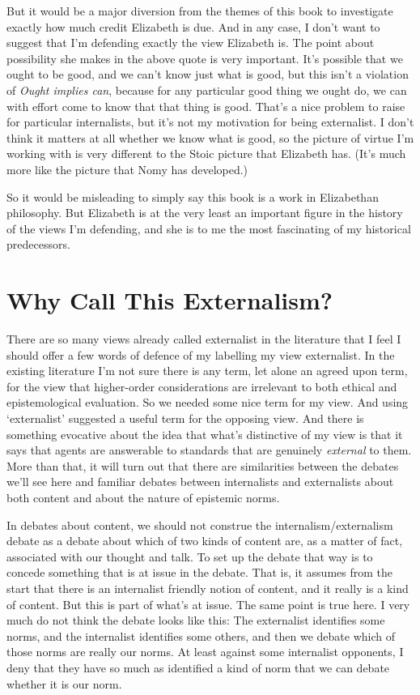But it would be a major diversion from the themes of this book to investigate exactly how much credit Elizabeth is due. And in any case, I don't want to suggest that I'm defending exactly the view Elizabeth is. The point about possibility she makes in the above quote is very important. It's possible that we ought to be good, and we can't know just what is good, but this isn't a violation of \emph{Ought implies can}, because for any particular good thing we ought do, we can with effort come to know that that thing is good. That's a nice problem to raise for particular internalists, but it's not my motivation for being externalist. I don't think it matters at all whether we know what is good, so the picture of virtue I'm working with is very different to the Stoic picture that Elizabeth has. (It's much more like the picture that Nomy \citet{Arpaly2003} has developed.)

So it would be misleading to simply say this book is a work in Elizabethan philosophy. But Elizabeth is at the very least an important figure in the history of the views I'm defending, and she is to me the most fascinating of my historical predecessors.

\section{Why Call This Externalism?}
\label{whycallthisexternalism}

There are so many views already called externalist in the literature that I feel I should offer a few words of defence of my labelling my view externalist. In the existing literature I'm not sure there is any term, let alone an agreed upon term, for the view that higher-order considerations are irrelevant to both ethical and epistemological evaluation. So we needed some nice term for my view. And using `externalist' suggested a useful term for the opposing view. And there is something evocative about the idea that what's distinctive of my view is that it says that agents are answerable to standards that are genuinely \emph{external} to them. More than that, it will turn out that there are similarities between the debates we'll see here and familiar debates between internalists and externalists about both content and about the nature of epistemic norms.

In debates about content, we should not construe the internalism\slash externalism debate as a debate about which of two kinds of content are, as a matter of fact, associated with our thought and talk. To set up the debate that way is to concede something that is at issue in the debate. That is, it assumes from the start that there is an internalist friendly notion of content, and it really is a kind of content. But this is part of what's at issue. The same point is true here. I very much do not think the debate looks like this: The externalist identifies some norms, and the internalist identifies some others, and then we debate which of those norms are really our norms. At least against some internalist opponents, I deny that they have so much as identified a kind of norm that we can debate whether it is our norm.

